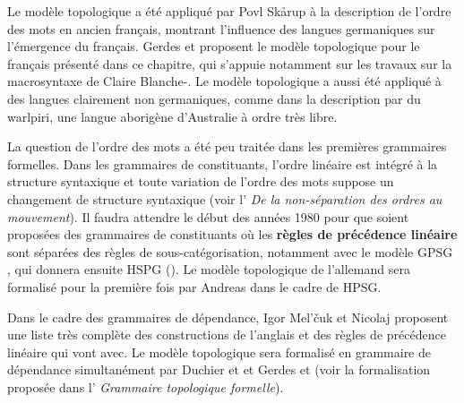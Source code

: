 {    Le modèle topologique a été appliqué par Povl Skårup  à la description de l’ordre des mots en ancien français, montrant l’influence des langues germaniques sur l’émergence du français. Gerdes et \citet{Kahane2006} proposent le modèle topologique pour le français présenté dans ce chapitre, qui s’appuie notamment sur les travaux sur la macrosyntaxe de Claire Blanche-\citet{Benveniste1990}. Le modèle topologique a aussi été appliqué à des langues clairement non germaniques, comme dans la description par \citet{DonohueSag1999} du warlpiri, une langue aborigène d’Australie à ordre très libre.

    La question de l’ordre des mots a été peu traitée dans les premières grammaires formelles. Dans les grammaires de constituants, l’ordre linéaire est intégré à la structure syntaxique et toute variation de l’ordre des mots suppose un changement de structure syntaxique (voir l’ \textit{De la non-séparation des ordres au mouvement}). Il faudra attendre le début des années 1980 pour que soient proposées des grammaires de constituants où les \textbf{règles de précédence linéaire} sont séparées des règles de sous-catégorisation, notamment avec le modèle GPSG \citep{GazdarEtAl1985}, qui donnera ensuite HSPG (\citealt{PollardSag1987}). Le modèle topologique de l’allemand sera formalisé pour la première fois par Andreas \citet{Kathol1995} dans le cadre de HPSG.

    Dans le cadre des grammaires de dépendance, Igor Mel’čuk et Nicolaj \citet{Pertsov1987} proposent une liste très complète des constructions de l’anglais et des règles de précédence linéaire qui vont avec. Le modèle topologique sera formalisé en grammaire de dépendance simultanément par Duchier et \citet{Debusmann2001} et Gerdes et \citet{Kahane2001} (voir la formalisation proposée dans l’ \textit{Grammaire topologique formelle}).
}
